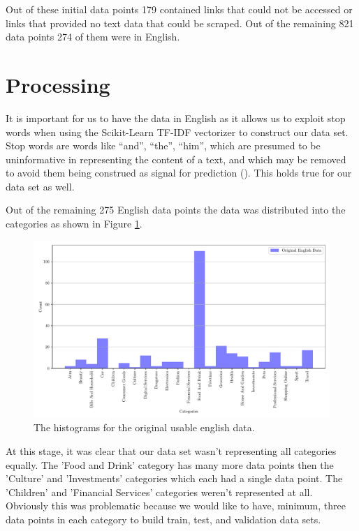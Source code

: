 Out of these initial data points 179 contained links that could not be accessed or links that provided no text data that could be scraped. Out of the remaining 821 data points 274 of them were in English. 

\section{Processing}

It is important for us to have the data in English as it allows us to exploit stop words when using the Scikit-Learn TF-IDF vectorizer to construct our data set. Stop words are words like “and”, “the”, “him”, which are presumed to be uninformative in representing the content of a text, and which may be removed to avoid them being construed as signal for prediction (\cite{sklearn62feature}). This holds true for our data set as well.

Out of the remaining 275 English data points the data was distributed into the categories as shown in Figure \ref{fig:original_english_counts}.

\begin{figure}[!ht]
  \centering
  \includegraphics[width=\textwidth]{../img/plot_original_english_counts.pdf}
  \caption{The histograms for the original usable english data.}
  \label{fig:original_english_counts}
\end{figure}

At this stage, it was clear that our data set wasn't representing all categories equally. The 'Food and Drink' category has many more data points then the 'Culture' and 'Investments' categories which each had a single data point. The 'Children' and 'Financial Services' categories weren't represented at all. Obviously this was problematic because we would like to have, minimum, three data points in each category to build train, test, and validation data sets.

